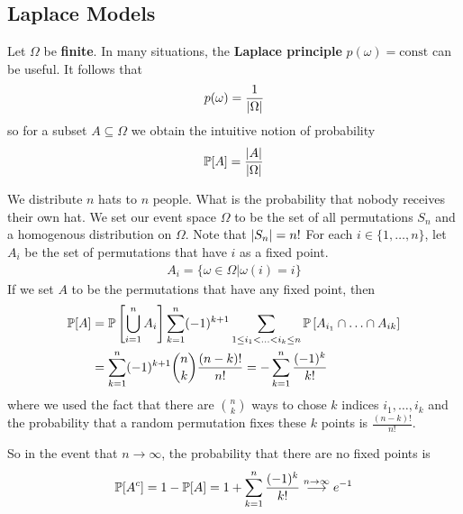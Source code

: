\subsection{Laplace Models}
Let $\Omega$ be \textbf{finite}. In many situations, the \textbf{Laplace principle} $p(\omega) = \text{const}$ can be useful. It follows that 
\begin{align*}
  p(\omega) = \frac{1}{\vert\Omega\vert}
\end{align*}
so for a subset $A \subseteq \Omega$ we obtain the intuitive notion of probability
\begin{align*}
  \mathbb{P}[A] = \frac{\vert A\vert}{\vert\Omega\vert}
\end{align*}

\begin{ex}
  We distribute $n$ hats to $n$ people. What is the probability that nobody receives their own hat.
  We set our event space $\Omega$ to be the set of all permutations $S_n$ and a homogenous distribution on $\Omega$. Note that $\vert S_n\vert = n!$
  For each $i \in \{1, \ldots, n\}$, let $A_i$ be the set of permutations that have $i$ as a fixed point.
  \begin{align*}
    A_i = \{\omega \in \Omega \big\vert \omega(i) = i\}
  \end{align*}
  If we set $A$ to be the permutations that have any fixed point, then
  \begin{align*}
    \mathbb{P}[A] &= \mathbb{P}\left[\bigcup_{i=1}^{n}A_i \right] \sum_{k=1}^{n} (-1)^{k+1} \sum_{1 \leq i_1< \ldots <i_k \leq n} \mathbb{P} \left[
      A_{i_1} \cap \ldots \cap A_{ik}
    \right]\\
             &= \sum_{k=1}^{n} (-1)^{k+1} \binom{n}{k} \frac{(n-k)!}{n!} = - \sum_{k=1}^{n} \frac{(-1)^{k}}{k!}
  \end{align*}
  where we used the fact that there are $\binom{n}{k}$ ways to chose $k$ indices $i_{1}, \ldots, i_{k}$ and the probability that a random permutation fixes these $k$ points is $\frac{(n-k)!}{n!}$.

  So in the event that $n \to \infty$, the probability that there are no fixed points is
  \begin{align*}
    \mathbb{P}[A^{c}] = 1 - \mathbb{P}[A] = 1 + \sum_{k=1}^{n} \frac{(-1)^{k}}{k!} \stackrel{n \to  \infty}{\longrightarrow} e^{-1}
  \end{align*}

\end{ex}

